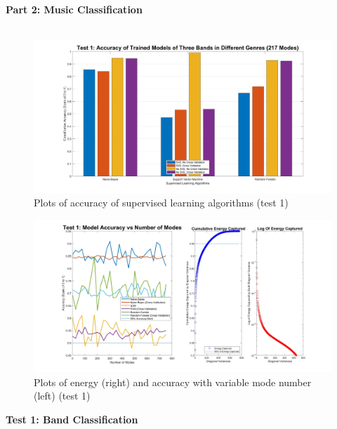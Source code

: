 \documentclass{article}
\begin{document}
	\textbf{Part 2: Music Classification} \\ \\
\begin{figure}[H]
\begin{center}
\includegraphics[width = 16cm]{acc1}
\caption{\label{fig:scaled_diss}  Plots of accuracy of supervised learning algorithms (test 1)}
\end{center}
\end{figure}
\begin{figure}[H]
\begin{center}
\includegraphics[width = 18cm]{use1}
\caption{\label{fig:scaled_diss} Plots of energy (right) and accuracy with variable mode number (left)  (test 1) }
\end{center}
\end{figure}
	\textbf{Test 1: Band Classification}
\end{document}

